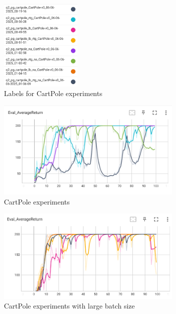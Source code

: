 \documentclass{article}
\begin{document}
\begin{figure}[H]
    \centering
    \includegraphics[width=0.35\textwidth]{img/q2_label.png}
    \caption{Labels for CartPole experiments}
    \label{fig:label_cartpole}
\end{figure}

\begin{figure}[H]
    \centering
    \includegraphics[width=0.8\textwidth]{img/cartpole_eval_avg_return.png}
    \caption{CartPole experiments}
    \label{fig:cartpole}
\end{figure}

\begin{figure}[H]
    \centering
    \includegraphics[width=0.8\textwidth]{img/cartpole_lb_eval_avg_return.png}
    \caption{CartPole experiments with large batch size}
    \label{fig:cartpole_lb}
\end{figure}
\end{document}

